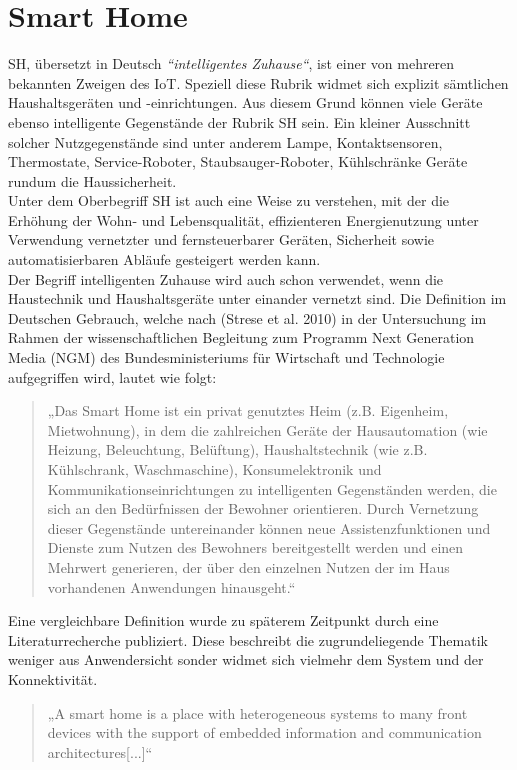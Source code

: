 \section{Smart Home}
\label{sec:smartHome}
    \acl{SH}, übersetzt in Deutsch \textit{“intelligentes Zuhause“}, ist einer von mehreren bekannten Zweigen des \acs{IoT}. 
    Speziell diese Rubrik widmet sich explizit 
    sämtlichen Haushaltsgeräten und -einrichtungen. Aus diesem Grund können viele Geräte ebenso intelligente Gegenstände 
    der Rubrik \acl{SH} sein. Ein kleiner Ausschnitt solcher Nutzgegenstände sind unter anderem Lampe, Kontaktsensoren, 
    Thermostate, Service-Roboter, Staubsauger-Roboter, Kühlschränke Geräte rundum die Haussicherheit. 
    \\ 
    Unter dem Oberbegriff \acl{SH} ist auch eine Weise zu verstehen, mit der die Erhöhung der Wohn- und Lebensqualität, 
    effizienteren Energienutzung unter Verwendung vernetzter und fernsteuerbarer Geräten, Sicherheit sowie automatisierbaren 
    Abläufe gesteigert werden kann. 
    \\ 
    Der Begriff intelligenten Zuhause wird auch schon verwendet, wenn die Haustechnik und Haushaltsgeräte unter einander  
    vernetzt sind. Die Definition im Deutschen Gebrauch, welche nach (Strese et al. 2010) in der Untersuchung im Rahmen 
    der wissenschaftlichen Begleitung zum Programm Next Generation Media (NGM) des Bundesministeriums für Wirtschaft und 
    Technologie aufgegriffen wird, lautet wie folgt: 
    \begin{quote}
        „Das Smart Home ist ein privat genutztes Heim (z.B. Eigenheim, Mietwohnung), in dem die zahlreichen Geräte der 
        Hausautomation (wie Heizung, Beleuchtung, Belüftung), Haushaltstechnik (wie z.B. Kühlschrank, Waschmaschine), 
        Konsumelektronik und Kommunikationseinrichtungen zu intelligenten Gegenständen werden, die sich an den 
        Bedürfnissen der Bewohner orientieren. Durch Vernetzung dieser Gegenstände untereinander können neue 
        Assistenzfunktionen und Dienste zum Nutzen des Bewohners bereitgestellt werden und einen Mehrwert 
        generieren, der über den einzelnen Nutzen der im Haus vorhandenen Anwendungen hinausgeht.“ \cite{strese.2010m}
    \end{quote}
    Eine vergleichbare Definition wurde zu späterem Zeitpunkt durch eine Literaturrecherche publiziert. Diese beschreibt 
    die zugrundeliegende Thematik weniger aus Anwendersicht sonder widmet sich vielmehr dem System und der Konnektivität. 
    \begin{quote}
        „A smart home is a place with heterogeneous systems to many
        front devices with the support of embedded information and
        communication architectures[...]“ \cite{Balakrishnan2018}
    \end{quote}
